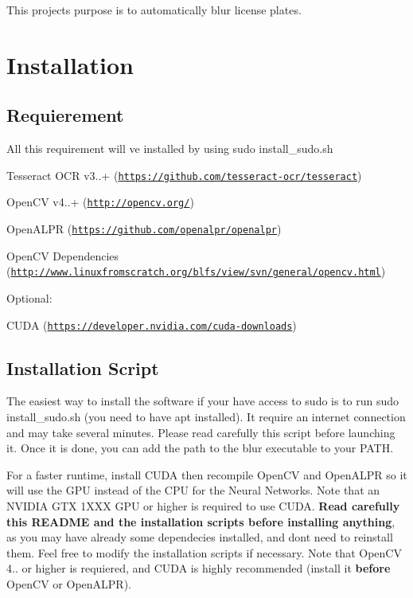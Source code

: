 This project\textquotesingle{}s purpose is to automatically blur license plates.

\section*{Installation}

\subsection*{Requierement}

All this requirement will ve installed by using {\ttfamily sudo install\+\_\+sudo.\+sh}
\begin{DoxyItemize}
\item Tesseract O\+CR v3..+ (\href{https://github.com/tesseract-ocr/tesseract}{\tt https\+://github.\+com/tesseract-\/ocr/tesseract})
\item Open\+CV v4..+ (\href{http://opencv.org/}{\tt http\+://opencv.\+org/})
\item Open\+A\+L\+PR (\href{https://github.com/openalpr/openalpr}{\tt https\+://github.\+com/openalpr/openalpr})
\item Open\+CV Dependencies (\href{http://www.linuxfromscratch.org/blfs/view/svn/general/opencv.html}{\tt http\+://www.\+linuxfromscratch.\+org/blfs/view/svn/general/opencv.\+html})
\end{DoxyItemize}

Optional\+:
\begin{DoxyItemize}
\item C\+U\+DA (\href{https://developer.nvidia.com/cuda-downloads}{\tt https\+://developer.\+nvidia.\+com/cuda-\/downloads})
\end{DoxyItemize}

\subsection*{Installation Script}

The easiest way to install the software if your have access to sudo is to run {\ttfamily sudo install\+\_\+sudo.\+sh} (you need to have {\ttfamily apt} installed). It require an internet connection and may take several minutes. Please read carefully this script before launching it. Once it is done, you can add the path to the {\ttfamily blur} executable to your {\ttfamily P\+A\+TH}.

For a faster runtime, install C\+U\+DA then recompile Open\+CV and Open\+A\+L\+PR so it will use the G\+PU instead of the C\+PU for the Neural Networks. Note that an N\+V\+I\+D\+IA G\+TX 1\+X\+XX G\+PU or higher is required to use C\+U\+DA. {\bfseries Read carefully this R\+E\+A\+D\+ME and the installation scripts before installing anything}, as you may have already some dependecies installed, and don\textquotesingle{}t need to reinstall them. Feel free to modify the installation scripts if necessary. Note that Open\+CV 4.. or higher is requiered, and C\+U\+DA is highly recommended (install it {\bfseries before} Open\+CV or Open\+A\+L\+PR).

